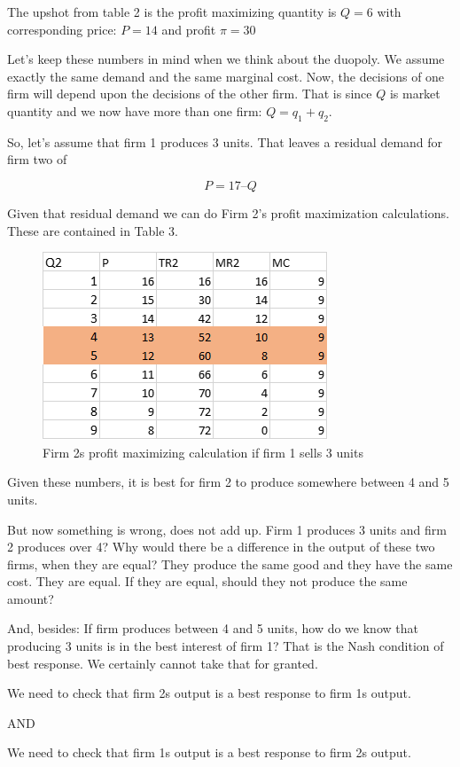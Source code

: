 \documentclass[
]{book}
\begin{document}
The upshot from table 2 is the profit maximizing quantity is \(Q = 6\) with corresponding price: \(P=14\) and profit \(\pi=30\)

Let's keep these numbers in mind when we think about the duopoly. We assume exactly the same demand and the same marginal cost. Now, the decisions of one firm will depend upon the decisions of the other firm. That is since \(Q\) is market quantity and we now have more than one firm: \(Q=q_1+q_2\).

So, let's assume that firm 1 produces 3 units. That leaves a residual demand for firm two of

\[P = 17 – Q\]

Given that residual demand we can do Firm 2's profit maximization calculations. These are contained in Table 3.

\begin{figure}

{\centering \includegraphics[width=0.5\linewidth]{img/oligopoly/fig3} 

}

\caption{Firm 2s profit maximizing calculation if firm 1 sells 3 units}\label{fig:oligopoly03}
\end{figure}

Given these numbers, it is best for firm 2 to produce somewhere between 4 and 5 units.

But now something is wrong, does not add up. Firm 1 produces 3 units and firm 2 produces over 4? Why would there be a difference in the output of these two firms, when they are equal? They produce the same good and they have the same cost. They are equal. If they are equal, should they not produce the same amount?

And, besides: If firm produces between 4 and 5 units, how do we know that producing 3 units is in the best interest of firm 1? That is the Nash condition of best response. We certainly cannot take that for granted.

\begin{center}
We need to check that firm 2s output is a best response to firm 1s output.

AND

We need to check that firm 1s output is a best response to firm 2s output.

\end{center}
\end{document}
